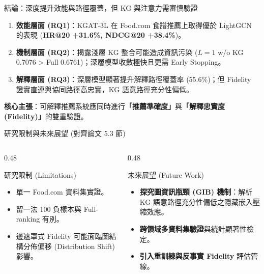 \documentclass[aspectratio=169, 10pt]{beamer}
\begin{document}
\begin{frame}{結論：深度提升效能與路徑覆蓋，但 KG 與注意力需審慎驗證}
  \begin{enumerate}
    \item \textbf{效能層面 (RQ1)}：KGAT-3L 在 Food.com 食譜推薦上取得優於 LightGCN 的表現 (\textbf{HR@20 +31.6\%, NDCG@20 +38.4\%})。
    \item \textbf{機制層面 (RQ2)}：揭露淺層 KG 整合可能造成資訊污染 ($L=1$ w/o KG 0.7076 > Full 0.6761)；深層模型收斂極快且更需 Early Stopping。
    \item \textbf{解釋層面 (RQ3)}：深層模型顯著提升解釋路徑覆蓋率 (55.6\%)；但 Fidelity 證實直連與協同路徑高忠實，KG 語意路徑充分性偏低。
  \end{enumerate}
  
  \vspace{0.3cm}
  \centering
  \textbf{核心主張}：可解釋推薦系統應同時進行\textbf{「推薦準確度」}與\textbf{「解釋忠實度 (Fidelity)」}的雙重驗證。
\end{frame}

\begin{frame}{研究限制與未來展望 (對齊論文 5.3 節)}
  \begin{columns}[T]
    \begin{column}{0.48\textwidth}
      \begin{block}{研究限制 (Limitations)}
        \begin{itemize}
          \item 單一 Food.com 資料集實證。
          \item 留一法 100 負樣本與 Full-ranking 有別。
          \item 邊遮罩式 Fidelity 可能面臨圖結構分佈偏移 (Distribution Shift) 影響。
        \end{itemize}
      \end{block}
    \end{column}
    
    \begin{column}{0.48\textwidth}
      \begin{block}{未來展望 (Future Work)}
        \begin{itemize}
          \item \textbf{探究圖資訊瓶頸 (GIB) 機制}：解析 KG 語意路徑充分性偏低之隱藏嵌入壓縮效應。
          \item \textbf{跨領域多資料集驗證}與統計顯著性檢定。
          \item \textbf{引入重訓練與反事實 Fidelity} 評估管線。
        \end{itemize}
      \end{block}
    \end{column}
  \end{columns}
\end{frame}
\end{document}

